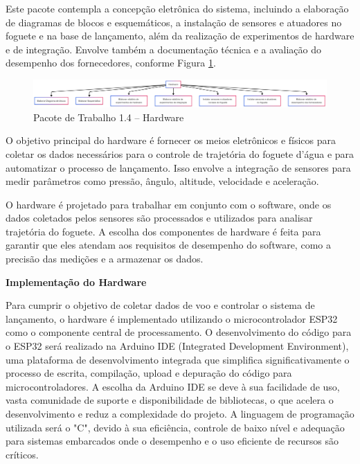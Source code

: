 Este pacote contempla a concepção eletrônica do sistema, incluindo a elaboração de diagramas de blocos e esquemáticos, a instalação de sensores e atuadores no foguete e na base de lançamento, além da realização de experimentos de hardware e de integração. Envolve também a documentação técnica e a avaliação do desempenho dos fornecedores, conforme Figura \ref{fig_eap_hardware}.


\begin{figure}[!h]
	\centering
\includegraphics[width=15cm]{figuras/eap_hardware.png}
	\caption{Pacote de Trabalho 1.4 – Hardware}
	\label{fig_eap_hardware} 
\end{figure}

O objetivo principal do hardware é fornecer os meios eletrônicos e físicos para coletar os dados necessários para o controle de trajetória do foguete d'água e para automatizar o processo de lançamento. Isso envolve a integração de sensores para medir parâmetros como pressão, ângulo, altitude, velocidade e aceleração.

O hardware é projetado para trabalhar em conjunto com o software, onde os dados coletados pelos sensores são processados e utilizados para analisar trajetória do foguete. A escolha dos componentes de hardware é feita para garantir que eles atendam aos requisitos de desempenho do software, como a precisão das medições e a armazenar os dados.

\textbf{Implementação do Hardware}

Para cumprir o objetivo de coletar dados de voo e controlar o sistema de lançamento, o hardware é implementado utilizando o microcontrolador ESP32 como o componente central de processamento. O desenvolvimento do código para o ESP32 será realizado na Arduino IDE (Integrated Development Environment), uma plataforma de desenvolvimento integrada que simplifica significativamente o processo de escrita, compilação, upload e depuração do código para microcontroladores. A escolha da Arduino IDE se deve à sua facilidade de uso, vasta comunidade de suporte e disponibilidade de bibliotecas, o que acelera o desenvolvimento e reduz a complexidade do projeto. A linguagem de programação utilizada será o "C", devido à sua eficiência, controle de baixo nível e adequação para sistemas embarcados onde o desempenho e o uso eficiente de recursos são críticos.

